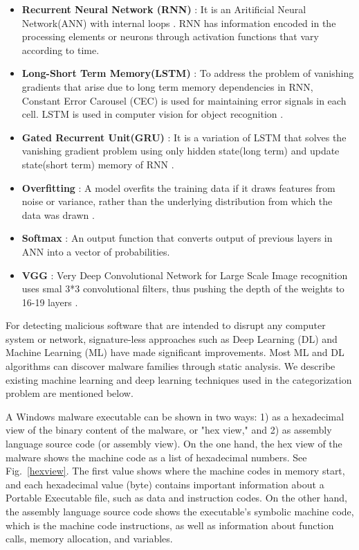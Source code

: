 \documentclass[pdflatex,sn-mathphys]{sn-jnl}%
\begin{document}
\begin{itemize}
    \item\textbf{Recurrent Neural Network (RNN)} : It is an Aritificial Neural Network(ANN) with internal loops \cite{51}. RNN has information encoded in the processing elements or neurons through activation functions that vary according to time. 
    \item\textbf{Long-Short Term Memory(LSTM)} : To address the problem of vanishing gradients that arise due to long term memory dependencies in RNN, Constant Error Carousel (CEC) is used for maintaining error signals in each cell. LSTM is used in computer vision for object recognition \cite{52}. 
    \item\textbf{Gated Recurrent Unit(GRU)} : It is a variation of LSTM that solves the vanishing gradient problem using only hidden state(long term) and update state(short term) memory of RNN \cite{53}.
     \item\textbf{Overfitting} : A model overfits the training data if it draws features from noise or variance, rather than the underlying distribution from which the data was drawn \cite{54}. 
      \item\textbf{Softmax} : An output function that converts output of previous layers in ANN into a vector of probabilities. 
       \item\textbf{VGG} : Very Deep Convolutional Network for Large Scale Image recognition uses smal 3*3 convolutional filters, thus pushing the depth of the weights to 16-19 layers \cite{55}.
\end{itemize}
\color{black}
For detecting malicious software that are intended to disrupt any computer system or network, signature-less approaches such as 
Deep Learning (DL) and Machine Learning (ML) have made significant improvements.  Most ML and DL algorithms can discover malware families through static analysis. We describe existing machine learning and deep learning techniques used in the categorization problem are mentioned below.

\color {blue} A Windows malware executable can be shown in two ways: 1) as a hexadecimal view of the binary content of the malware, or "hex view," and 2) as assembly language source code (or assembly view). On the one hand, the hex view of the malware shows the machine code as a list of hexadecimal numbers. See Fig.~\ref{hexview}. The first value shows where the machine codes in memory start, and each hexadecimal value (byte) contains important information about a Portable Executable file, such as data and instruction codes. On the other hand, the assembly language source code shows the executable's symbolic machine code, which is the machine code instructions, as well as information about function calls, memory allocation, and variables. 
\end{document}
